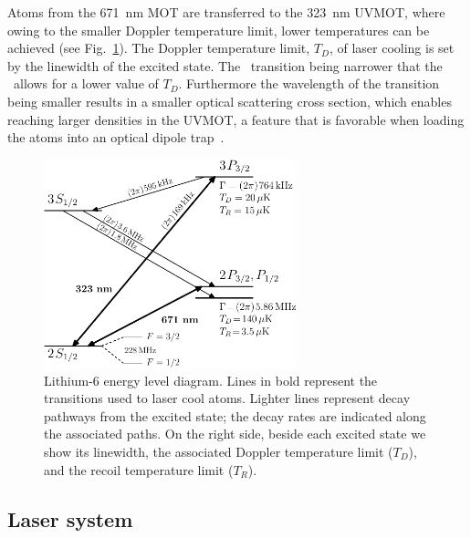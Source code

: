 Atoms from the 671~nm MOT are transferred to the 323~nm UVMOT, where owing to
the smaller Doppler temperature limit,  lower temperatures can be achieved (see
Fig.~\ref{fig:323levels}).   The Doppler temperature limit, $T_{D}$, of laser
cooling is set by the linewidth of the excited state.  The \uv\ transition
being narrower that the \red\ allows for a lower value of $T_{D}$.  Furthermore
the wavelength of the transition being smaller results in a smaller optical
scattering cross section, which enables reaching larger densities in the UVMOT,
a feature that is favorable when loading the atoms into an optical dipole
trap~\cite{Duarte2011}. 
\begin{figure} \centering
\includegraphics[width=0.65\textwidth]{../masters-figures/levels/323-levels/lithium.pdf}
\caption[Lithium-6 energy level diagram showing the  state]{\small
Lithium-6 energy level diagram. Lines in bold represent the transitions used to
laser cool atoms. Lighter lines represent decay pathways from the excited
 state; the decay rates are indicated along the associated paths. On
the right side, beside each excited state we show its linewidth, the associated
Doppler temperature limit ($T_{D}$),  and the recoil temperature limit
($T_{R}$).  }
\label{fig:323levels} \end{figure} 

\subsection{Laser system}

